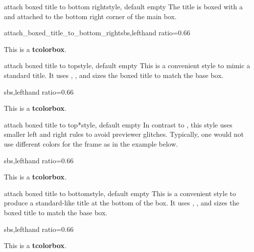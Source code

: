 \begin{docTcbKey}{attach boxed title to bottom right}{}{style, default empty}
The title is boxed with a  and attached to
the bottom right corner of the main box.
\begin{exdispExample*}{attach_boxed_title_to_bottom_right}{sbs,lefthand ratio=0.66}
\begin{tcolorbox}[enhanced,title=My title,
  attach boxed title to bottom right]
  This is a \textbf{tcolorbox}.
\end{tcolorbox}
\end{exdispExample*}
\end{docTcbKey}


\clearpage
\begin{docTcbKey}[][doc new=2016-02-26]{attach boxed title to top}{}{style, default empty}
  This is a convenient style to mimic a standard title.
  It uses ,
  , and sizes the boxed title to match
  the base box.
\begin{dispExample*}{sbs,lefthand ratio=0.66}
\begin{tcolorbox}[enhanced,title=My title,
  attach boxed title to top,
  boxed title style={colframe=red}]
  This is a \textbf{tcolorbox}.
\end{tcolorbox}
\end{dispExample*}
\end{docTcbKey}

\begin{docTcbKey}[][doc new=2016-02-26]{attach boxed title to top*}{}{style, default empty}
  In contrast to , this style
  uses smaller left and right rules to avoid previewer glitches.
  Typically, one would not use different colors for the frame as in the
  example below.
\begin{dispExample*}{sbs,lefthand ratio=0.66}
\begin{tcolorbox}[enhanced,title=My title,
  attach boxed title to top*,
  boxed title style={colframe=red}]
  This is a \textbf{tcolorbox}.
\end{tcolorbox}
\end{dispExample*}
\end{docTcbKey}

\begin{docTcbKey}[][doc new=2016-02-26]{attach boxed title to bottom}{}{style, default empty}
  This is a convenient style to produce a standard-like title at the bottom
  of the box.
  It uses ,
  , and sizes the boxed title to match
  the base box.
\begin{dispExample*}{sbs,lefthand ratio=0.66}
\begin{tcolorbox}[enhanced,title=My title,
  attach boxed title to bottom,
  boxed title style={colframe=red}]
  This is a \textbf{tcolorbox}.
\end{tcolorbox}
\end{dispExample*}
\end{docTcbKey}

